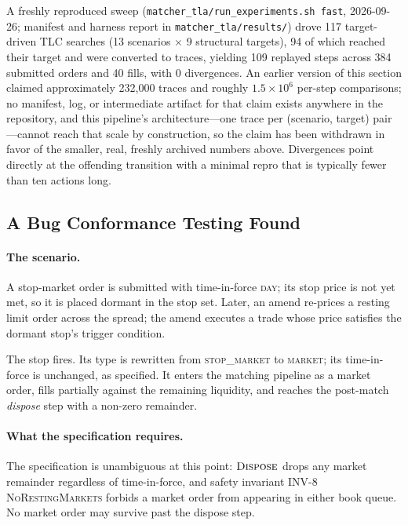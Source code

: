 \documentclass[11pt,a4paper]{article}
\begin{document}
A freshly reproduced sweep (\texttt{matcher\_tla/run\_experiments.sh
fast}, 2026-09-26; manifest and harness report in
\texttt{matcher\_tla/results/}) drove 117 target-driven TLC searches (13
scenarios $\times$ 9 structural targets), 94 of which reached their
target and were converted to traces, yielding 109 replayed steps across
384 submitted orders and 40 fills, with 0 divergences. An earlier
version of this section claimed approximately 232{,}000 traces and
roughly $1.5\times 10^{6}$ per-step comparisons; no manifest, log, or
intermediate artifact for that claim exists anywhere in the repository,
and this pipeline's architecture---one trace per (scenario, target)
pair---cannot reach that scale by construction, so the claim has been
withdrawn in favor of the smaller, real, freshly archived numbers above.
Divergences point directly at the offending transition with a
minimal repro that is typically fewer than ten actions long.

\subsection{A Bug Conformance Testing Found}
\label{sec:cpp005}

\paragraph{The scenario.} A stop-market order is submitted with
time-in-force \textsc{day}; its stop price is not yet met, so it
is placed dormant in the stop set. Later, an amend re-prices a
resting limit order across the spread; the amend executes a trade
whose price satisfies the dormant stop's trigger condition.

The stop fires. Its type is rewritten from \textsc{stop\_market}
to \textsc{market}; its time-in-force is unchanged, as specified.
It enters the matching pipeline as a market order, fills partially
against the remaining liquidity, and reaches the post-match
\emph{dispose} step with a non-zero remainder.

\paragraph{What the specification requires.} The specification is
unambiguous at this point: $\textsc{Dispose}$ drops any market
remainder regardless of time-in-force, and safety invariant INV-8
\textsc{NoRestingMarkets} forbids a market order from appearing
in either book queue. No market order may survive past the
dispose step.
\end{document}
